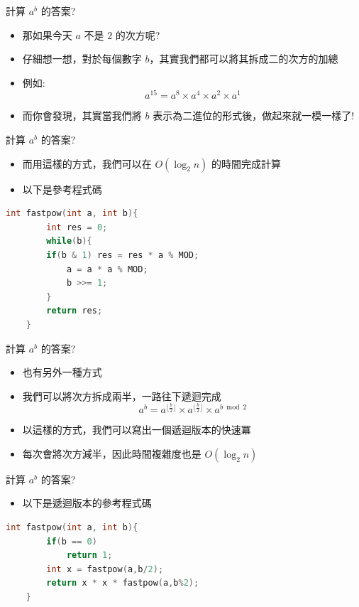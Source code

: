 \documentclass[aspectratio=169]{beamer}
\begin{document}
    \begin{frame}{計算 $a^b$ 的答案?}
        \begin{itemize}
            \item 那如果今天 $a$ 不是 $2$ 的次方呢?
            \item<2-> 仔細想一想，對於每個數字 $b$，其實我們都可以將其拆成二的次方的加總
            \item<3-> 例如:
            $$a^{15} = a^8 \times a^4 \times a^2 \times a^1$$
            \item<4-> 而你會發現，其實當我們將 $b$ 表示為二進位的形式後，做起來就一模一樣了!
        \end{itemize}
    \end{frame}
    
    \begin{frame}[fragile]{計算 $a^b$ 的答案?}
        \begin{itemize}
            \item 而用這樣的方式，我們可以在 $O(\log_2 n)$ 的時間完成計算
            \item 以下是參考程式碼
        \end{itemize}
        \begin{lstlisting}[language=C++,basicstyle=\ttfamily\small]
    int fastpow(int a, int b){
        int res = 0;
        while(b){
        if(b & 1) res = res * a % MOD;
            a = a * a % MOD;
            b >>= 1;
        }
        return res;
    }
        \end{lstlisting}
    \end{frame}
    
    \begin{frame}{計算 $a^b$ 的答案?}
        \begin{itemize}
            \item 也有另外一種方式
            \item<2-> 我們可以將次方拆成兩半，一路往下遞迴完成
            $$a^b = a^{\lfloor \frac{b}{2} \rfloor} \times  a^{\lfloor \frac{b}{2} \rfloor} \times a^{b \bmod 2}$$
            \item<3-> 以這樣的方式，我們可以寫出一個遞迴版本的快速冪
            \item<3-> 每次會將次方減半，因此時間複雜度也是 $O(\log_2 n)$
        \end{itemize}
    \end{frame}
    
    \begin{frame}[fragile]{計算 $a^b$ 的答案?}
        \begin{itemize}
            \item 以下是遞迴版本的參考程式碼
        \end{itemize}
        \begin{lstlisting}[language=C++,basicstyle=\ttfamily\small]
    int fastpow(int a, int b){
        if(b == 0)
            return 1;
        int x = fastpow(a,b/2);
        return x * x * fastpow(a,b%2);
    }
        \end{lstlisting}
    \end{frame}
    
\end{document}
